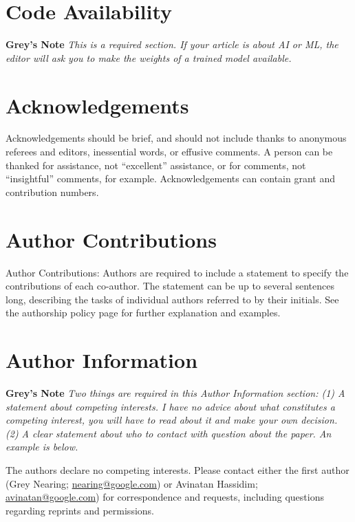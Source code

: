 \documentclass[pdflatex]{sn-jnl}
\begin{document}
\section*{Code Availability}
\textbf{Grey's Note} \textit{This is a required section. If your article is about AI or ML, the editor will ask you to make the weights of a trained model available.}


\renewcommand\refname{SI References}
\begin{thebibliography}{10}

\end{thebibliography}\newpage



\newpage
\section*{Acknowledgements}
Acknowledgements should be brief, and should not include thanks to anonymous referees and editors, inessential words, or effusive comments. A person can be thanked for assistance, not “excellent” assistance, or for comments, not “insightful” comments, for example. Acknowledgements can contain grant and contribution numbers.

\section*{Author Contributions}
Author Contributions: Authors are required to include a statement to specify the contributions of each co-author. The statement can be up to several sentences long, describing the tasks of individual authors referred to by their initials. See the authorship policy page for further explanation and examples.


\section*{Author Information}
\textbf{Grey's Note} \textit{Two things are required in this Author Information section: (1) A statement about competing interests. I have no advice about what constitutes a competing interest, you will have to read about it and make your own decision. (2) A clear statement about who to contact with question about the paper. An example is below.}

The authors declare no competing interests. Please contact either the first author (Grey Nearing; \href{mailto:nearing@google.com}{nearing@google.com}) or Avinatan Hassidim; \href{mailto:avinatan@google.com}{avinatan@google.com}) for correspondence and requests, including questions regarding reprints and permissions.
\end{document}
